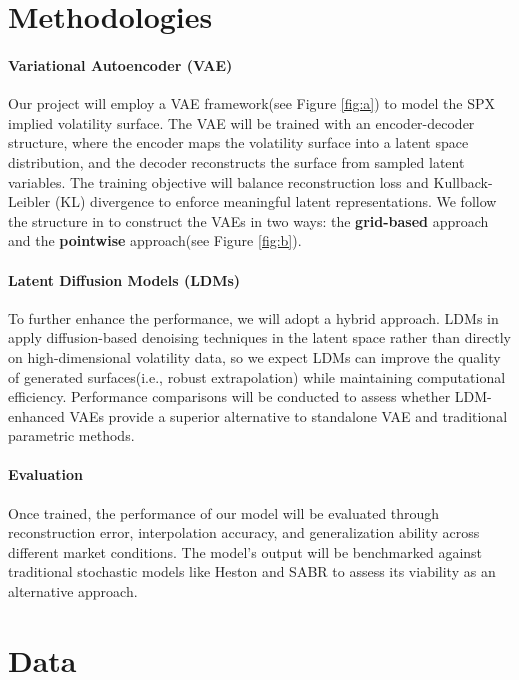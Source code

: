 \documentclass{article}
\newcommand{\figref}[1]{Figure \ref{#1}}
\begin{document}
\section{Methodologies}
\paragraph{Variational Autoencoder (VAE)}
Our project will employ a VAE framework(see \figref{fig:a}) to model the SPX implied volatility surface. The VAE will be trained with an encoder-decoder structure, where the encoder maps the volatility surface into a latent space distribution, and the decoder reconstructs the surface from sampled latent variables. The training objective will balance reconstruction loss and Kullback-Leibler (KL) divergence to enforce meaningful latent representations. We follow the structure in \cite{vaeorigin} to construct the VAEs in two ways: the \textbf{grid-based} approach and the \textbf{pointwise} approach(see \figref{fig:b}).

\paragraph{Latent Diffusion Models (LDMs)}
To further enhance the performance, we will adopt a hybrid approach. LDMs in \cite{rombach2022highresolutionimagesynthesislatent} apply diffusion-based denoising techniques in the latent space rather than directly on high-dimensional volatility data, so we expect LDMs can  improve the quality of generated surfaces(i.e., robust extrapolation) while maintaining computational efficiency. Performance comparisons will be conducted to assess whether LDM-enhanced VAEs provide a superior alternative to standalone VAE and traditional parametric methods.



\paragraph{Evaluation} Once trained, the performance of our model will be evaluated through reconstruction error, interpolation accuracy, and generalization ability across different market conditions. The model’s output will be benchmarked against traditional stochastic models like Heston \cite{wolfram_volsurface_heston} and SABR \cite{wolfram_volsurface_sabr} to assess its viability as an alternative approach.

\section{Data}
\end{document}
